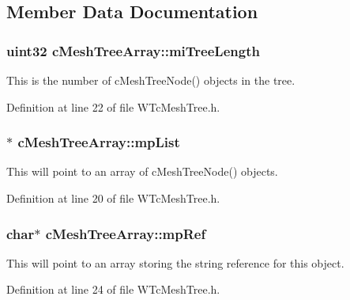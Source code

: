 \subsection{Member Data Documentation}
\hypertarget{classc_mesh_tree_array_a23d238161a175633f64af87a2bc85984}{
\subsubsection[{miTreeLength}]{\setlength{\rightskip}{0pt plus 5cm}uint32 {\bf cMeshTreeArray::miTreeLength}}}
\label{classc_mesh_tree_array_a23d238161a175633f64af87a2bc85984}


This is the number of cMeshTreeNode() objects in the tree. 



Definition at line 22 of file WTcMeshTree.h.

\hypertarget{classc_mesh_tree_array_a83f4ee5f93ed62e7f939eed3b5e68cda}{
\subsubsection[{mpList}]{$\ast$ {\bf cMeshTreeArray::mpList}}}
\label{classc_mesh_tree_array_a83f4ee5f93ed62e7f939eed3b5e68cda}


This will point to an array of cMeshTreeNode() objects. 



Definition at line 20 of file WTcMeshTree.h.

\hypertarget{classc_mesh_tree_array_a1114b12bb1a849122403e0d2e1fb2ec6}{
\subsubsection[{mpRef}]{\setlength{\rightskip}{0pt plus 5cm}char$\ast$ {\bf cMeshTreeArray::mpRef}}}
\label{classc_mesh_tree_array_a1114b12bb1a849122403e0d2e1fb2ec6}


This will point to an array storing the string reference for this object. 



Definition at line 24 of file WTcMeshTree.h.

